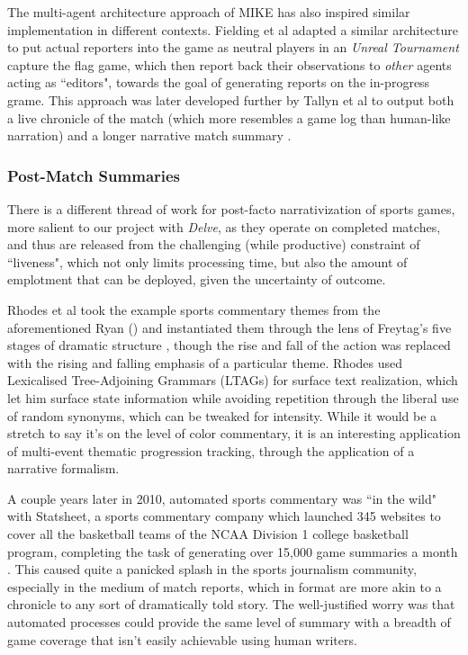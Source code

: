The multi-agent architecture approach of MIKE has also inspired similar implementation in different contexts. Fielding et al \cite{embodied_agents} adapted a similar architecture to put actual reporters into the game as neutral players in an \textit{Unreal Tournament} capture the flag game, which then report back their observations to \textit{other} agents acting as ``editors", towards the goal of generating reports on the in-progress grame. This approach was later developed further by Tallyn et al to output both a live chronicle of the match (which more resembles a game log than human-like narration) and a longer narrative match summary \cite{embodied_agents}.

\subsubsection{Post-Match Summaries}\label{subsubsec:post-match-summaries}

There is a different thread of work for post-facto narrativization of sports games, more salient to our project with \textit{Delve}, as they operate on completed matches, and thus are released from the challenging (while productive) constraint of ``liveness", which not only limits processing time, but also the amount of emplotment that can be deployed, given the uncertainty of outcome.

Rhodes et al \cite{sports_freytag} took the example sports commentary themes from the aforementioned Ryan (\cite{mimesis_baseball}) and instantiated them through the lens of Freytag's five stages of dramatic structure \cite{freytag}, though the rise and fall of the action was replaced with the rising and falling emphasis of a particular theme. Rhodes used Lexicalised Tree-Adjoining Grammars (LTAGs) \cite{joshi1997tree} for surface text realization, which let him surface state information while avoiding repetition through the liberal use of random synonyms, which can be tweaked for intensity. While it would be a stretch to say it's on the level of color commentary, it is an interesting application of multi-event thematic progression tracking, through the application of a narrative formalism.

A couple years later in 2010, automated sports commentary was ``in the wild" with Statsheet, a sports commentary company which launched 345 websites to cover all the basketball teams of the NCAA Division 1 college basketball program, completing the task of generating over 15,000 game summaries a month \cite{statsheet}. This caused quite a panicked splash in the sports journalism community, especially in the medium of match reports, which in format are more akin to a chronicle to any sort of dramatically told story. The well-justified worry was that automated processes could provide the same level of summary with a breadth of game coverage that isn't easily achievable using human writers.

